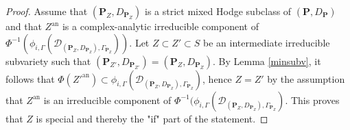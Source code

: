 \documentclass[10pt]{article}
\numberwithin{equation}{subsection}
\theoremstyle{plain}
\theoremstyle{definition}
\theoremstyle{remark}
\newcommand{\C}{\mathbb C}
\newcommand{\sm}{\mathrm{sm}}
\newcommand{\pp}{\mathbf P}
\newcommand{\an}{\mathrm{an}}
\newcommand{\period}{\mathscr{D}}
\begin{document}
\begin{proof}
Assume that $(\pp_Z, D_{\pp_Z})$ is a strict mixed Hodge subclass of $(\pp, D_\pp)$ and that $Z^\an$ is a complex-analytic irreducible component of $\Phi^{-1}(\phi_{i, \Gamma}(\period_{(\pp_Z, D_{\pp_Z}), \Gamma_{\pp_Z}}))$. Let $Z \subset Z' \subset S$ be an intermediate irreducible subvariety such that $(\pp_{Z'}, D_{\pp_{Z'}}) = (\pp_Z, D_{\pp_Z})$. By Lemma \ref{minsubv}, it follows that $\Phi(Z'^\an) \subset  \phi_{i, \Gamma}(\period_{(\pp_Z, D_{\pp_Z}), \Gamma_{\pp_Z}})$, hence $Z = Z'$ by the assumption that $Z^\an$ is an irreducible component of $\Phi^{-1}(\phi_{i, \Gamma}(\period_{(\pp_Z, D_{\pp_Z}), \Gamma_{\pp_Z}})$. This proves that $Z$ is special and thereby the "if" part of the statement.


\end{proof}
\end{document}
